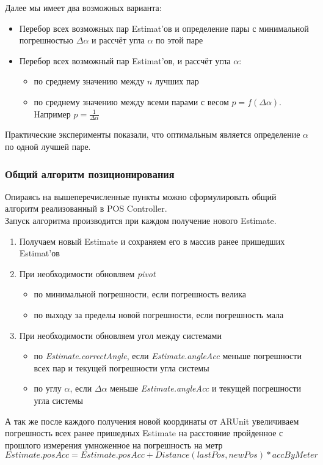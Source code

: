 \documentclass[a4paper, 11pt, titlepage]{article}
\begin{document}
          Далее мы имеет два возможных варианта:
          \begin{itemize}
            \item Перебор всех возможных пар Estimat'ов и определение пары с минимальной погрешностью $\Delta\alpha$ и рассчёт угла $\alpha$ по этой паре
            \item Перебор всех возможный пар Estimat'ов, и рассчёт угла $\alpha$:
            \begin{itemize}
              \item по среднему значению между $n$ лучших пар 
              \item по среднему значению между всеми парами с весом $p = f(\Delta\alpha)$. Например $p = \frac{1}{\Delta\alpha}$
            \end{itemize}
          \end{itemize}

          Практические эксперименты показали, что оптимальным является определение $\alpha$ по одной лучшей паре.

        \subsubsection{Общий алгоритм позиционирования}
          Опираясь на вышеперечисленные пункты можно сформулировать общий алгоритм реализованный в POS Controller.\\
          Запуск алгоритма производится при каждом получение нового Estimate.
          \begin{enumerate}
            \item Получаем новый Estimate и сохраняем его в массив ранее пришедших Estimat'ов
            \item При необходимости обновляем \textit{pivot}
              \begin{itemize}
                \item по минимальной погрешности, если погрешность велика
                \item по выходу за пределы новой погрешности, если погрешность мала
              \end{itemize}
            \item При необходимости обновляем угол между системами
              \begin{itemize}
                \item по \textit{Estimate.correctAngle}, если \textit{Estimate.angleAcc} меньше погрешности всех пар и текущей погрешности угла системы 
                \item по углу $\alpha$, если $\Delta\alpha$ меньше \textit{Estimate.angleAcc} и текущей погрешности угла системы  
              \end{itemize}
          \end{enumerate}
          А так же после каждого получения новой координаты от ARUnit увеличиваем погрешность всех ранее пришедных Estimate на
          расстояние пройденное с прошлого измерения умноженное на погрешность на метр 
          $Estimate.posAcc = Estimate.posAcc + Distance(lastPos, newPos) * accByMeter$
\end{document}
